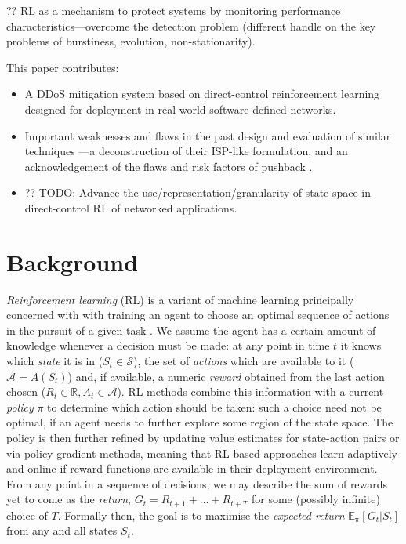 \documentclass[conference, letterpaper, 10pt, times]{IEEEtran}
\begin{document}
?? RL as a mechanism to protect systems by monitoring performance characteristics---overcome the detection problem (different handle on the key problems of burstiness, evolution, non-stationarity).

This paper contributes:
\begin{itemize}
	\item A DDoS mitigation system based on direct-control reinforcement learning designed for deployment in real-world software-defined networks.
	\item Important weaknesses and flaws in the past design and evaluation of similar techniques \cite{DBLP:journals/eaai/MalialisK15}---a deconstruction of their ISP-like formulation, and an acknowledgement of the flaws and risk factors of pushback \cite{DBLP:journals/ccr/MahajanBFIPS02a}.
	\item ?? TODO: Advance the use/representation/granularity of state-space in direct-control RL of networked applications.
\end{itemize}

\section{Background}

\emph{Reinforcement learning} (RL) is a variant of machine learning principally concerned with with training an agent to choose an optimal sequence of actions in the pursuit of a given task \cite{RL2E}.
We assume the agent has a certain amount of knowledge whenever a decision must be made: at any point in time $t$ it knows which \emph{state} it is in ($S_t \in \mathcal{S}$), the set of \emph{actions} which are available to it ($\mathcal{A} = A(S_t)$) and, if available, a numeric \emph{reward} obtained from the last action chosen ($R_t \in \mathbb{R}, A_t \in \mathcal{A}$).
RL methods combine this information with a current \emph{policy} $\pi$ to determine which action should be taken: such a choice need not be optimal, if an agent needs to further explore some region of the state space.
The policy is then further refined by updating value estimates for state-action pairs or via policy gradient methods, meaning that RL-based approaches learn adaptively and online if reward functions are available in their deployment environment.
From any point in a sequence of decisions, we may describe the sum of rewards yet to come as the \emph{return}, $G_t = R_{t+1} + \ldots + R_{t+T}$ for some (possibly infinite) choice of $T$.
Formally then, the goal is to maximise the \emph{expected return} $\operatorname{\mathbb{E}_{\pi}}[G_t | S_t]$ from any and all states $S_t$.
\end{document}

